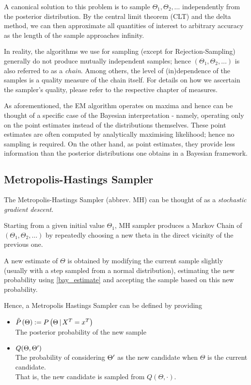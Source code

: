	A canonical solution to this problem is to sample $\Theta_1, \Theta_2, \dots$ independently from the posterior distribution. By the central limit theorem (CLT) and the delta method, we can then approximate all quantities of interest to arbitrary accuracy as the length of the sample approaches infinity. 
	
	In reality, the algorithms we use for sampling (except for Rejection-Sampling) generally do not produce mutually independent samples; hence $\left(\Theta_1, \Theta_2, \dots \right)$ is also referred to as a \textit{chain}. Among others, the level of (in)dependence of the samples is a quality measure of the chain itself. For details on how we ascertain the sampler's quality, please refer to the respective chapter of measures.   
	
	
	As aforementioned, the EM algorithm operates on maxima and hence can be thought of a specific case of the Bayesian interpretation - namely, operating only on the point estimates instead of the distributions themselves. These point estimates are often computed by analytically maximising likelihood; hence no sampling is required. On the other hand, as point estimates, they provide less information than the posterior distributions one obtains in a Bayesian framework. 
	
	

	\subsection{Metropolis-Hastings Sampler}
	The Metropolis-Hastings Sampler (abbrev. MH) can be thought of as a \textit{stochastic gradient descent}. 
	
	Starting from a given initial value $\Theta_1$,  MH sampler produces a Markov Chain of $\left(\Theta_1, \Theta_2, \dots \right)$ by repeatedly choosing a new theta in the direct vicinity of the previous one. 
	
	A new estimate of $\Theta$ is obtained by modifying the current sample slightly (usually with a step sampled from a normal distribution), estimating the new probability using \ref{bay_estimate} and accepting the sample based on this new probability. 
	
	Hence, a Metropolis Hastings Sampler can be defined by providing
	\begin{itemize}
		\item $\tilde{P}\left(\Theta\right) := P\left(\Theta \, | \, X^T = x^T\right)$\\
			  The posterior probability of the new sample 
		\item $Q(\Theta, \Theta^\prime)$ \\
			  The probability of considering $\Theta^\prime$ as the new candidate when $\Theta$ is the current candidate. \\
			  That is, the new candidate is sampled from $Q(\Theta, \cdot)$. 
	\end{itemize}
	

